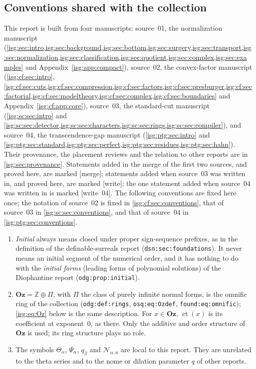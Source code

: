 \documentclass[11pt]{article}
\theoremstyle{definition}
\theoremstyle{remark}
\newcommand{\Oz}{\ensuremath{\mathbf{Oz}}}
\newcommand{\Z}{\mathbb{Z}}
\newcommand{\ct}{\operatorname{ct}}
\newcommand{\replabel}[1]{\nolinkurl{#1}}
\begin{document}
\subsection{Conventions shared with the collection}\label{isg:sec:conventions}
This report is built from four manuscripts: source~01, the normalization
manuscript (\cref{isg:sec:intro,isg:sec:background,isg:sec:bottom,isg:sec:surgery,isg:sec:transport,isg:sec:normalization,isg:sec:classification,isg:sec:quotient,isg:sec:complex,isg:sec:examples}
and Appendix~\ref{isg:app:compact}), source~02, the convex-factor manuscript
(\cref{isg:cf:sec:intro}, \cref{isg:cf:sec:cuts,isg:cf:sec:compression,isg:cf:sec:factors,isg:cf:sec:presburger,isg:cf:sec:factorial,isg:cf:sec:modeltheory,isg:cf:sec:complex,isg:cf:sec:boundaries}
and Appendix~\ref{isg:cf:app:core}), source~03, the standard-cut
manuscript (\cref{isg:sc:sec:intro} and
\cref{isg:sc:sec:detector,isg:sc:sec:characters,isg:sc:sec:rings,isg:sc:sec:compiler}),
and source~04, the transcendence-gap manuscript (\cref{isg:ptg:sec:intro} and
\cref{isg:ptg:sec:standard,isg:ptg:sec:perfect,isg:ptg:sec:residues,isg:ptg:sec:hahn}).
Their provenance, the placement reviews and
the relation to other reports are in \cref{isg:sec:provenance}. Statements
added in the merge of the first two sources, and proved here, are marked
\textup{[merge]}; statements added when source~03 was written in, and
proved here, are marked \textup{[write]}; the one statement added when
source~04 was written in is marked \textup{[write~04]}. The following
conventions are fixed here once; the notation of source~02 is fixed in
\cref{isg:cf:sec:conventions}, that of source~03 in
\cref{isg:sc:sec:conventions}, and that of source~04 in
\cref{isg:ptg:sec:conventions}.
\begin{enumerate}
\item \emph{Initial} always means closed under proper sign-sequence
      prefixes, as in the definition of the definable-surreals report
      (\replabel{dsn:sec:foundations}). It never means an initial segment
      of the numerical order, and it has nothing to do with the
      \emph{initial forms} (leading forms of polynomial solutions) of the
      Diophantine report (\replabel{odg:prop:initial}).
\item $\Oz=\Z\oplus\Pi$, with $\Pi$ the class of purely infinite normal
      forms, is the omnific ring of the collection
      (\replabel{odg:def:rings}, \replabel{osq:eq:Ozdef},
      \replabel{found:eq:omnific}); \eqref{isg:eq:Oz} below is the same
      description. For $x\in\Oz$, $\ct(x)$ is its coefficient at
      exponent~$0$, as there. Only the additive and order structure of
      $\Oz$ is used; its ring structure plays no role.
\item The symbols $\Theta_\alpha$, $\Psi_\alpha$, $q_\beta$ and
      $\mathcal N_{\alpha,n}$ are local to this report. They are unrelated
      to the theta series and to the nome or dilation parameter $q$ of
      other reports.
\end{enumerate}
\end{document}
